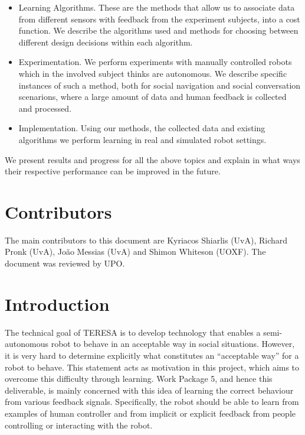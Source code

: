 \documentclass[a4paper,11pt]{report}
\begin{document}
\begin{itemize}
  \item Learning Algorithms. These are the methods that allow us to associate data from different sensors with feedback from the experiment subjects, into a cost function. We describe the algorithms used and methods for choosing between different design decisions within each algorithm.
  \item Experimentation. We perform experiments with manually 
controlled robots which in the involved subject thinks are autonomous. We describe 
specific instances of such a method, both for social navigation and social conversation scenarions, where a 
  large amount of data and human feedback is collected and processed.
  \item Implementation. Using our methods, the collected data and existing algorithms we perform learning in real and simulated robot settings.
\end{itemize}

We present results and progress for all the above topics and explain in what 
ways their respective performance can be improved in the future.

\section{Contributors}\label{sec:cont}

The main contributors to this document are Kyriacos Shiarlis (UvA), Richard Pronk (UvA), Jo\~{a}o Messias (UvA) and Shimon Whiteson (UOXF). The document was reviewed by UPO.

\newpage

\section{Introduction}\label{sec:intro}

The technical goal of TERESA is to develop technology that enables a semi-autonomous robot to behave in an acceptable way in social situations. However, it is very hard to determine explicitly what constitutes an “acceptable way” for a robot to behave. This statement acts as motivation in this project, which aims to overcome this difficulty through learning. Work Package 5, and hence this deliverable, is mainly concerned with this idea of learning the correct behaviour from various feedback signals. Specifically, the robot should be able to learn from examples of human controller and from implicit or explicit feedback from people controlling or interacting with the robot.
\end{document}
